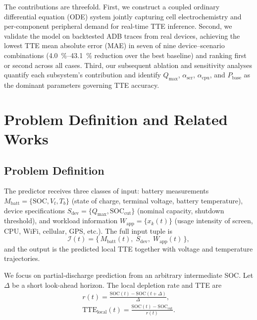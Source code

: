 \documentclass[conference]{IEEEtran}
\begin{document}
The contributions are threefold. First, we construct a coupled ordinary differential equation (ODE) system jointly capturing cell electrochemistry and per-component peripheral demand for real-time TTE inference. Second, we validate the model on backtested ADB traces from real devices, achieving the lowest TTE mean absolute error (MAE) in seven of nine device--scenario combinations (\SI{4.0}{\percent}--\SI{43.1}{\percent} reduction over the best baseline) and ranking first or second across all cases. Third, our subsequent ablation and sensitivity analyses quantify each subsystem's contribution and identify $Q_{\max}$, $\alpha_{\mathrm{scr}}$, $\alpha_{\mathrm{cpu}}$, and $P_{\mathrm{base}}$ as the dominant parameters governing TTE accuracy.





\section{Problem Definition and Related Works}

\subsection{Problem Definition}
\label{subsec:problem}

The predictor receives three classes of input: battery measurements $M_{\mathrm{batt}} = \{\mathrm{SOC}, V_t, T_b\}$ (state of charge, terminal voltage, battery temperature), device specifications $S_{\mathrm{dev}} = \{Q_{\max}, \mathrm{SOC}_{\mathrm{cut}}\}$ (nominal capacity, shutdown threshold), and workload information $W_{\mathrm{app}} = \{x_k(t)\}$ (usage intensity of screen, CPU, WiFi, cellular, GPS, etc.). The full input tuple is
\begin{equation}
    \mathcal{I}(t) = \bigl\{\, M_{\mathrm{batt}}(t),\; S_{\mathrm{dev}},\; W_{\mathrm{app}}(t)\,\bigr\},
    \label{eq:input_tuple}
\end{equation}
and the output is the predicted local TTE together with voltage and temperature trajectories.

We focus on partial-discharge prediction from an arbitrary intermediate SOC. Let $\Delta$ be a short look-ahead horizon. The local depletion rate and TTE are
\begin{equation}
    \begin{gathered}
    r(t) = \frac{\mathrm{SOC}(t) - \mathrm{SOC}(t + \Delta)}{\Delta}, \\[4pt]
    \mathrm{TTE}_{\mathrm{local}}(t) = \frac{\mathrm{SOC}(t) - \mathrm{SOC}_{\mathrm{cut}}}{r(t)}.
    \end{gathered}
    \label{eq:tte_local}
\end{equation}
\end{document}
